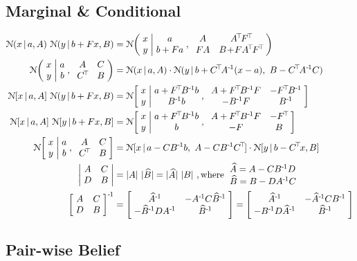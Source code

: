 \subsection{Marginal \& Conditional}
\begin{align}
\NN(x \| a,A)~ \NN(y \| b+Fx,B)
 &= \NN\bigg( \arr{c}{x\\ y} \bigg| \arr{c}{a\\ b+Fa} ,~
             \arr{cc}{A & A^\T F^\T\\ F A & B\!+\!F A^\T F^\T} \bigg) \\
%
\NN\bigg( \arr{c}{x\\ y} \bigg| \arr{c}{a\\ b} ,~ 
         \arr{cc}{A & C\\ C^\T & B} \bigg)
&= \NN(x \| a,A) \cdot \NN(y \| b+C^\T A^\1(x-a),~ B - C^\T A^\1 C) \\
%
\NN[ x \| a,A ]~ \NN(y \| b+Fx,B )
 &= \NN\bigg[ \arr{c}{x\\ y} \bigg| \arr{c}{a+F^\T B^\1 b \\ B^\1 b} ,~
             \arr{cc}{A+F^\T B^\1 F & -F^\T B^\1 \\ -B^\1 F & B^\1} \bigg] \\
%
\NN[x \| a,A ]~ \NN[y \| b+Fx,B ]
 &= \NN\bigg[ \arr{c}{x\\ y} \bigg| \arr{c}{a+F^\T B^\1 b \\ b} ,~
             \arr{cc}{A+F^\T B^\1  F & -F^\T \\ -F & B} \bigg] \\
%
\NN\bigg[ \arr{c}{x\\ y} \bigg| \arr{c}{a\\ b} ,~ 
         \arr{cc}{A & C\\ C^\T & B} \bigg]
&= \NN[x \| a - C B^\1 b,~ A - C B^\1 C^\T] \cdot \NN[y \| b-C^\T x,B] \\
\de{A}{C}{D}{B}
 &= |A|~ |\bar B| = |\bar A|~ |B| ~,
 \text{where } \arr{l}{ \bar A = A - C B^\1 D \\ \bar B = B - D A^\1 C }\\
\ma{A}{C}{D}{B}^\1
 &= \ma{\bar A^\1}{-A^\1 C \bar B^\1}{-\bar B^\1 D A^\1}{\bar B^\1}
 = \ma{\bar A^\1}{-\bar A^\1 C B^\1}{-B^\1 D \bar A^\1}{\bar B^\1}
\end{align}

\subsection{Pair-wise Belief}

